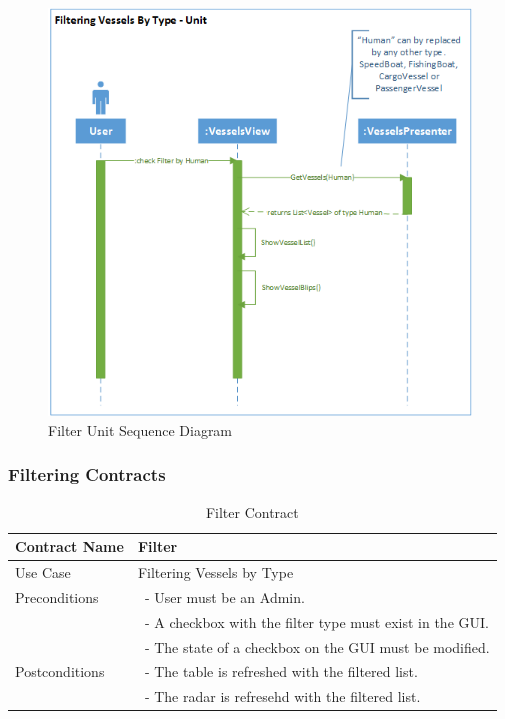 \documentclass[12pt]{article}
\begin{document}
\begin{figure}[h!]
    \centering
    \includegraphics[scale=0.9]{4_filter_unit}
    \caption{Filter Unit Sequence Diagram}
    \label{fig:FilterUnitSequenceDiagram}
\end{figure}

\clearpage

\subsubsection{Filtering Contracts}

\begin{table}[ht]
\centering
   \begin{tabular}{|l|l|}
        \hline
        Contract Name & Filter\\
        \hline
        Use Case & Filtering Vessels by Type\\
        \hline
        Preconditions & \ - User must be an Admin.\\
                      & \ - A checkbox with the filter type must exist in the GUI.\\
                      & \ - The state of a checkbox on the GUI must be modified.\\
        \hline
        Postconditions & \ - The table is refreshed with the filtered list.\\
                       & \ - The radar is refresehd with the filtered list.\\
        \hline
    \end{tabular}
\caption{Filter Contract}
\end{table}
\end{document}

